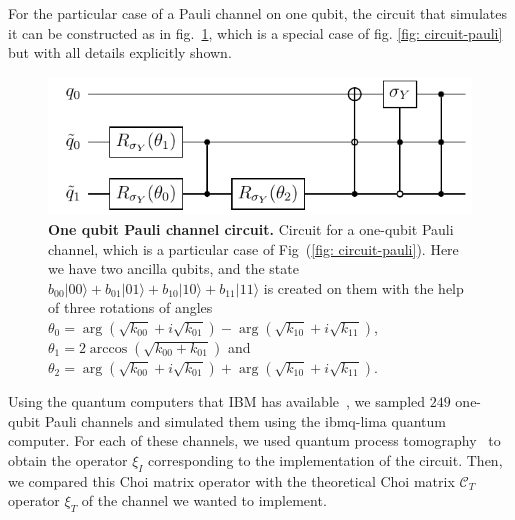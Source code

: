 \documentclass[10pt,letterpaper]{article} %
\begin{document}
For the particular case of a Pauli channel on one qubit, the circuit that
simulates it can be constructed as in fig.~\ref{fig: circuit-pauli-1},
which is a special case of fig. \ref{fig: circuit-pauli}
but with all details  explicitly shown.


\begin{figure} %
\centering
\includegraphics{images/circuito_unqubit.pdf}
\caption{
{\bf One qubit Pauli channel circuit.} Circuit for a one-qubit Pauli channel,
which is a particular case of Fig~(\ref{fig: circuit-pauli}).  Here we have two
ancilla qubits, and the state $b_{00} |00\rangle + b_{01} |01\rangle + b_{10}
|10\rangle + b_{11}|11\rangle$ is created on them with the help of three
rotations of angles $\theta_0 = \arg(\sqrt{k_{00}} + i \sqrt{k_{01}}) -
\arg(\sqrt{k_{10}} + i\sqrt{k_{11}})$, $ \theta_1 = 2 \arccos(\sqrt{k_{00} +
k_{01}})$ and $ \theta_2 = \arg(\sqrt{k_{00}} + i \sqrt{k_{01}}) +
\arg(\sqrt{k_{10}} + i\sqrt{k_{11}})$. }
\label{fig: circuit-pauli-1} 
\end{figure} %


Using the quantum computers that IBM has available~\cite{Qiskit}, we sampled
$249$ one-qubit Pauli channels and simulated them using the ibmq-lima quantum
computer.  For each of these channels, we used quantum process
tomography~\cite{Qiskit, Chuang:1996} to obtain the 
operator $\xi_I$ corresponding to the implementation of the
circuit.  Then, we compared this {\color{red}
Choi matrix} {\color{orange} operator} with the theoretical {\color{red} Choi
matrix $\mathcal{C}_T$} {\color{orange} operator $\xi_T$} of the channel we
wanted to implement.  
\end{document}
